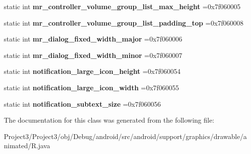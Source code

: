 \begin{DoxyCompactItemize}
static int {\bfseries mr\+\_\+controller\+\_\+volume\+\_\+group\+\_\+list\+\_\+max\+\_\+height} =0x7f060005
\item 
\mbox{\label{classandroid_1_1support_1_1graphics_1_1drawable_1_1animated_1_1R_1_1dimen_a711b447fde11bfa7d2136c6816c270cb}} 
static int {\bfseries mr\+\_\+controller\+\_\+volume\+\_\+group\+\_\+list\+\_\+padding\+\_\+top} =0x7f060008
\item 
\mbox{\label{classandroid_1_1support_1_1graphics_1_1drawable_1_1animated_1_1R_1_1dimen_aee664eba0bc1f327c03270644e0b4385}} 
static int {\bfseries mr\+\_\+dialog\+\_\+fixed\+\_\+width\+\_\+major} =0x7f060006
\item 
\mbox{\label{classandroid_1_1support_1_1graphics_1_1drawable_1_1animated_1_1R_1_1dimen_a1bf4bdd78a4c818a3774151b0f8a9a50}} 
static int {\bfseries mr\+\_\+dialog\+\_\+fixed\+\_\+width\+\_\+minor} =0x7f060007
\item 
\mbox{\label{classandroid_1_1support_1_1graphics_1_1drawable_1_1animated_1_1R_1_1dimen_a643fb2a068ff8b8142ba4dab15474b57}} 
static int {\bfseries notification\+\_\+large\+\_\+icon\+\_\+height} =0x7f060054
\item 
\mbox{\label{classandroid_1_1support_1_1graphics_1_1drawable_1_1animated_1_1R_1_1dimen_ac83c32c9e411e8e9a9d038ea6c3b8c39}} 
static int {\bfseries notification\+\_\+large\+\_\+icon\+\_\+width} =0x7f060055
\item 
\mbox{\label{classandroid_1_1support_1_1graphics_1_1drawable_1_1animated_1_1R_1_1dimen_a84b56c763599b6b742e85539a9117b75}} 
static int {\bfseries notification\+\_\+subtext\+\_\+size} =0x7f060056
\end{DoxyCompactItemize}


The documentation for this class was generated from the following file\+:\begin{DoxyCompactItemize}
\item 
Project3/\+Project3/obj/\+Debug/android/src/android/support/graphics/drawable/animated/R.\+java\end{DoxyCompactItemize}
